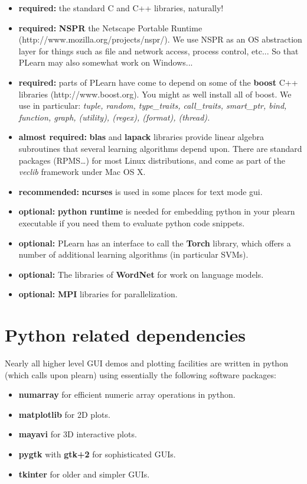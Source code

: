 \documentclass[11pt]{book}
\begin{document}
\begin{itemize}
\item {\bf required:} the standard C and C++ libraries, naturally!
\item {\bf required:} {\bf NSPR} the Netscape Portable Runtime
  (http://www.mozilla.org/projects/nspr/). We use NSPR as an OS abstraction
  layer for things such as file and network access, process control,
  etc... So that PLearn may also somewhat work on Windows...
\item {\bf required:} parts of PLearn have come to depend on some of the
  {\bf boost} C++ libraries (http://www.boost.org). You might as well install all
  of boost. We use in particular: {\em tuple, random, type\_traits, call\_traits, smart\_ptr, bind, function, graph, (utility), (regex), (format), (thread).}
\item {\bf almost required:} {\bf blas} and {\bf lapack} libraries provide linear algebra
  subroutines that several learning algorithms depend upon. There are standard
  packages (RPMS\ldots) for most Linux distributions, and come as part of
  the {\em veclib} framework under Mac OS X.
\item {\bf recommended:} {\bf ncurses} is used in some places for text mode
  gui.
\item {\bf optional:} {\bf python runtime} is needed for embedding python
  in your plearn executable if you need them to evaluate python code snippets.
\item {\bf optional:} PLearn has an interface to call the {\bf Torch}
  library, which offers a number of additional learning algorithms (in particular SVMs). 
\item {\bf optional:} The libraries of {\bf WordNet} for work on language
  models.
\item {\bf optional:} {\bf MPI} libraries for parallelization.
\end{itemize}

\section{Python related dependencies}

Nearly all higher level GUI demos and plotting facilities are written in
python (which calls upon plearn) using essentially the following software
packages: \\
\begin{itemize}
\item {\bf numarray} for efficient numeric array operations in python.
\item {\bf matplotlib} for 2D plots.
\item {\bf mayavi} for 3D interactive plots.
\item {\bf pygtk} with {\bf gtk+2} for sophisticated GUIs.
\item {\bf tkinter} for older and simpler GUIs.
\end{itemize}
\end{document}
